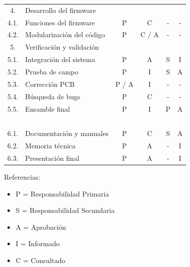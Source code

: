 \documentclass[11pt]{charter}
\begin{document}
\begin{table}[H]
{\begin{tabular}{|c|l|c|c|c|c|}
 \rowcolor[HTML]{FFD200}
 4. &
 \multicolumn{5}{|l|}{Desarrollo del firmware}\\ \cline{1-6}
 
 4.1. &Funciones del firmware  & P & C & - & - \\ \hline
 4.2. &Modularización del código & P & C / A  & - & - \\ \hline
 
 \rowcolor[HTML]{00FF00}
 5. &
 \multicolumn{5}{|l|}{Verificación y validación}\\ \cline{1-6}
 
 5.1. &Integración del sistema  & P & A  & S  & I \\ \hline
 5.2. &Prueba de campo  & P & I & S & A  \\ \hline
 5.3. &Corrección PCB  & P / A & I & - & - \\ \hline
 5.4. &Búsqueda de bugs  & P & C & - & - \\ \hline
 5.5. &Ensamble final  & P & I & P & A \\ \hline
 
 \rowcolor[HTML]{800080}
 \textcolor{white}{6. } &
 \multicolumn{5}{|l|}{\textcolor{white}{Proceso de cierre }}	\\ \cline{1-6} 
 
 6.1. &Documentación y manuales  & P & C & S & A \\ \hline
 6.2. &Memoria técnica  & P & A & - & I \\ \hline
 6.3. &Presentación final  & P & A & - & I \\ \hline    


\end{tabular}%
}
\end{table}

{\footnotesize
Referencias:
\begin{itemize}
	\item P = Responsabilidad Primaria
	\item S = Responsabilidad Secundaria
	\item A = Aprobación
	\item I = Informado
	\item C = Consultado
\end{itemize}
} %

\vspace{20px}

\end{document}
